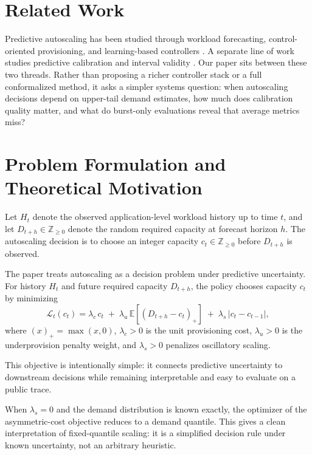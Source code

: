 \documentclass[11pt]{article}
\theoremstyle{plain}
\theoremstyle{definition}
\theoremstyle{remark}
\begin{document}
\section{Related Work}
Predictive autoscaling has been studied through workload forecasting, control-oriented provisioning, and learning-based controllers \cite{roy2011efficient,gandhi2014adaptive,qiu2023aware}. A separate line of work studies predictive calibration and interval validity \cite{guo2017calibration,shafer2008tutorial,xu2021conformal}. Our paper sits between these two threads. Rather than proposing a richer controller stack or a full conformalized method, it asks a simpler systems question: when autoscaling decisions depend on upper-tail demand estimates, how much does calibration quality matter, and what do burst-only evaluations reveal that average metrics miss?

\section{Problem Formulation and Theoretical Motivation}
Let $H_t$ denote the observed application-level workload history up to time $t$, and let $D_{t+h} \in \mathbb{Z}_{\ge 0}$ denote the random required capacity at forecast horizon $h$. The autoscaling decision is to choose an integer capacity $c_t \in \mathbb{Z}_{\ge 0}$ before $D_{t+h}$ is observed.

The paper treats autoscaling as a decision problem under predictive uncertainty. For history $H_t$ and future required capacity $D_{t+h}$, the policy chooses capacity $c_t$ by minimizing
\[
\mathcal{L}_t(c_t) =
\lambda_c \, c_t
\;+\;
\lambda_u \, \mathbb{E}\!\left[(D_{t+h} - c_t)_+\right]
\;+\;
\lambda_s \, |c_t - c_{t-1}|,
\]
where $(x)_+ = \max(x,0)$, $\lambda_c > 0$ is the unit provisioning cost, $\lambda_u > 0$ is the underprovision penalty weight, and $\lambda_s > 0$ penalizes oscillatory scaling.

This objective is intentionally simple: it connects predictive uncertainty to downstream decisions while remaining interpretable and easy to evaluate on a public trace.

When $\lambda_s=0$ and the demand distribution is known exactly, the optimizer of the asymmetric-cost objective reduces to a demand quantile. This gives a clean interpretation of fixed-quantile scaling: it is a simplified decision rule under known uncertainty, not an arbitrary heuristic.
\end{document}
